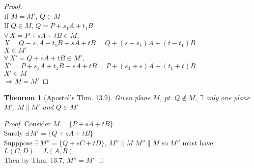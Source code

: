 \documentclass[twoside]{amsart}
\theoremstyle{plain}
\newtheorem{theorem}{Theorem}
\theoremstyle{definition}
\begin{document}
\begin{proof} \quad \\
\noindent If $M = M'$, \quad $Q \in M$ \\
If $Q \in M$, $Q = P + s_1 A + t_1 B $ \\
\quad $\forall \, X = P + sA + tB  \in M$, $X = Q - s_1 A - t_1 B + sA + tB = Q + (s-s_1)A + (t-t_1)B$ \\
\quad \quad $X \in M'$ \medskip \\
\quad $\forall \, X' = Q + sA + tB \in M'$, $X' = P + s_1 A + t_1 B + sA + tB = P + (s_1 +s)A + (t_1 +t) B$ \\
\quad \quad $X' \in M$  \bigskip \\
$\Longrightarrow M = M'$
\end{proof}

\begin{theorem}[Apostol's Thm. 13.9] Given plane $M$, pt. $Q \notin M$, 
$\exists$ only one plane $M'$, $M\parallel M'$ and $Q \in M'$ 
\end{theorem}
\begin{proof}
 \noindent Consider $M = \{ P + sA + tB \}$ \\
  Surely $\exists \, M' = \{ Q + sA + tB \}$  \\
  Supppose $\exists \, M'' = \{ Q + sC +tD \}$, $M'' \parallel M$ 
  \quad $M'' \parallel M$ so $M''$ must have $L(C,D) = L(A,B)$ \medskip \\
  \quad Then by Thm. 13.7, $M'' = M'$
\end{proof}
\end{document}
